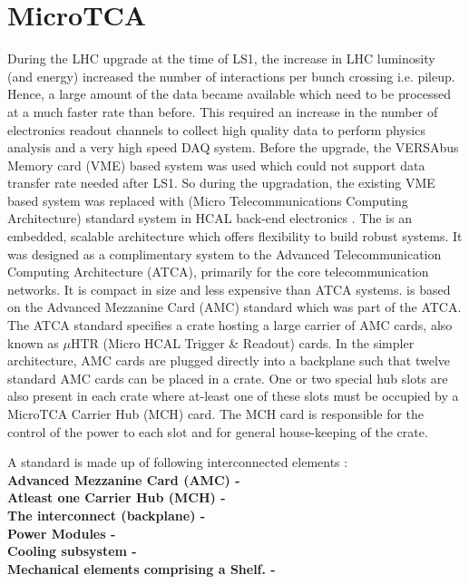 \section{MicroTCA}
During the LHC upgrade at the time of LS1, the increase in LHC luminosity (and energy) increased the number of interactions per bunch crossing i.e. pileup. Hence, a large amount of the data became available which need to be processed at a much faster rate than before. This required an increase in the number of electronics readout channels to collect high quality data to perform physics analysis and a very high speed DAQ system. Before the upgrade, the VERSAbus Memory card (VME) based system was used which could not support data transfer rate needed after LS1. So during the upgradation, the existing VME based system was replaced with \mtca (Micro Telecommunications Computing Architecture) standard system in HCAL back-end electronics \cite{CMS:2012tda}. The \mtca is an embedded, scalable architecture which offers flexibility to build robust systems. It was designed as a complimentary system to the Advanced Telecommunication Computing Architecture (ATCA), primarily for the core telecommunication networks. It is compact in size and less expensive than ATCA systems. \mtca is based on the Advanced Mezzanine Card (AMC) standard which was part of the ATCA. The ATCA standard specifies a crate hosting a large carrier of AMC cards, also known as $\mu$HTR (Micro HCAL Trigger \& Readout) cards. In the simpler \mtca architecture, AMC cards are plugged directly into a backplane such that twelve standard AMC cards can be placed in a crate. One or two special hub slots are also present in each crate where at-least one of these slots must be occupied by a MicroTCA Carrier Hub (MCH) card. The MCH card is responsible for the control of the power to each slot and for general house-keeping of the crate.


A \mtca standard is made up of following interconnected elements : \\ \newline
{\bf Advanced Mezzanine Card (AMC) -} \\ \newline
{\bf Atleast one \mtca Carrier Hub (MCH) -} \\ \newline
{\bf The interconnect (backplane) -} \\ \newline
{\bf Power Modules -} \\ \newline
{\bf Cooling subsystem -} \\ \newline
{\bf Mechanical elements comprising a Shelf. -} \\ \newline


